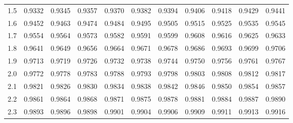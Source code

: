\begin{table}[p]
\begin{center}
{\begin{tabular}{c | rrrrr | rrrrr |}
  \hline
  1.5 & \footnotesize{0.9332} & \footnotesize{0.9345} & \footnotesize{0.9357} & \footnotesize{0.9370} & \footnotesize{0.9382} & \footnotesize{0.9394} & \footnotesize{0.9406} & \footnotesize{0.9418} & \footnotesize{0.9429} & \footnotesize{0.9441} \\
  1.6 & \footnotesize{0.9452} & \footnotesize{0.9463} & \footnotesize{0.9474} & \footnotesize{0.9484} & \footnotesize{0.9495} & \footnotesize{0.9505} & \footnotesize{0.9515} & \footnotesize{0.9525} & \footnotesize{0.9535} & \footnotesize{0.9545} \\
  1.7 & \footnotesize{0.9554} & \footnotesize{0.9564} & \footnotesize{0.9573} & \footnotesize{0.9582} & \footnotesize{0.9591} & \footnotesize{0.9599} & \footnotesize{0.9608} & \footnotesize{0.9616} & \footnotesize{0.9625} & \footnotesize{0.9633} \\
  1.8 & \footnotesize{0.9641} & \footnotesize{0.9649} & \footnotesize{0.9656} & \footnotesize{0.9664} & \footnotesize{0.9671} & \footnotesize{0.9678} & \footnotesize{0.9686} & \footnotesize{0.9693} & \footnotesize{0.9699} & \footnotesize{0.9706} \\
  1.9 & \footnotesize{0.9713} & \footnotesize{0.9719} & \footnotesize{0.9726} & \footnotesize{0.9732} & \footnotesize{0.9738} & \footnotesize{0.9744} & \footnotesize{0.9750} & \footnotesize{0.9756} & \footnotesize{0.9761} & \footnotesize{0.9767} \\
  \hline
  \hline
  2.0 & \footnotesize{0.9772} & \footnotesize{0.9778} & \footnotesize{0.9783} & \footnotesize{0.9788} & \footnotesize{0.9793} & \footnotesize{0.9798} & \footnotesize{0.9803} & \footnotesize{0.9808} & \footnotesize{0.9812} & \footnotesize{0.9817} \\
  2.1 & \footnotesize{0.9821} & \footnotesize{0.9826} & \footnotesize{0.9830} & \footnotesize{0.9834} & \footnotesize{0.9838} & \footnotesize{0.9842} & \footnotesize{0.9846} & \footnotesize{0.9850} & \footnotesize{0.9854} & \footnotesize{0.9857} \\
  2.2 & \footnotesize{0.9861} & \footnotesize{0.9864} & \footnotesize{0.9868} & \footnotesize{0.9871} & \footnotesize{0.9875} & \footnotesize{0.9878} & \footnotesize{0.9881} & \footnotesize{0.9884} & \footnotesize{0.9887} & \footnotesize{0.9890} \\
  2.3 & \footnotesize{0.9893} & \footnotesize{0.9896} & \footnotesize{0.9898} & \footnotesize{0.9901} & \footnotesize{0.9904} & \footnotesize{0.9906} & \footnotesize{0.9909} & \footnotesize{0.9911} & \footnotesize{0.9913} & \footnotesize{0.9916} \\

\end{tabular}}
\end{center}
\end{table}
